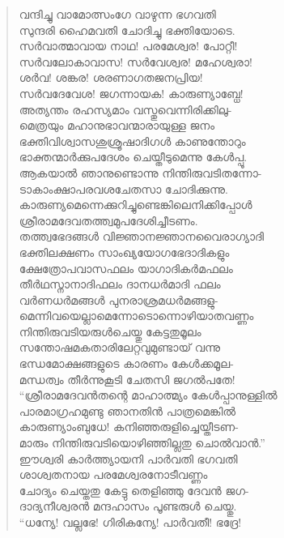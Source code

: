 \begin{verse}
വന്ദിച്ചു വാമോത്സംഗേ വാഴുന്ന ഭഗവതി\\
സുന്ദരി ഹൈമവതി ചോദിച്ചു ഭക്തിയോടെ.\\
സര്‍വാത്മാവായ നാഥ! പരമേശ്വര! പോറ്റീ!\\
സര്‍വലോകാവാസ! സര്‍വേശ്വര! മഹേശ്വരാ!\\
ശര്‍വ! ശങ്കര! ശരണാഗതജനപ്രിയ!\\
സര്‍വദേവേശ! ജഗന്നായക! കാരുണ്യാബ്ധേ!\\
അത്യന്തം രഹസ്യമാം വസ്തുവെന്നിരിക്കിലു-\\
മെത്രയും മഹാനുഭാവന്മാരായുള്ള ജനം\\
ഭക്തിവിശ്വാസശുശ്രൂഷാദിഗള്‍ കാണുന്തോറും\\
ഭാക്തന്മാര്‍ക്കുപദേശം ചെയ്തീടുമെന്നു കേള്‍പ്പൂ.\\
ആകയാല്‍ ഞാനുണ്ടൊന്നു നിന്തിരുവടിതന്നോ-\\
ടാകാംക്ഷാപരവശചേതസാ ചോദിക്കുന്നു.\\
കാരുണ്യമെന്നെക്കുറിച്ചുണ്ടെങ്കിലെനിക്കിപ്പോള്‍\\
ശ്രീരാമദേവതത്ത്വമുപദേശിച്ചീടണം.\\
തത്ത്വഭേദങ്ങള്‍ വിജ്ഞാനജ്ഞാനവൈരാഗ്യാദി\\
ഭക്തിലക്ഷണം സാംഖ്യയോഗഭേദാദികളും\\
ക്ഷേത്രോപവാസഫലം യാഗാദികര്‍മഫലം\\
തീര്‍ഥസ്നാനാദിഫലം ദാനധര്‍മാദി ഫലം\\
വര്‍ണധര്‍മങ്ങള്‍ പുനരാശ്രമധര്‍മങ്ങളു-\\
മെന്നിവയെല്ലാമെന്നോടൊന്നൊഴിയാതവണ്ണം\\
നിന്തിരുവടിയരുള്‍ചെയ്തു കേട്ടതുമൂലം\\
സന്തോഷമകതാരിലേറ്റവുമുണ്ടായ് വന്നു\\
ഭന്ധമോക്ഷങ്ങളുടെ കാരണം കേള്‍ക്കമൂല-\\
മന്ധത്വം തീര്‍ന്നുകൂടി ചേതസി ജഗല്‍പതേ!\\
“ശ്രീരാമദേവന്‍തന്റെ മാഹാത്മ്യം കേള്‍പ്പാനുള്ളില്‍\\
പാരമാഗ്രഹമുണ്ടു ഞാനതിന്‍ പാത്രമെങ്കില്‍\\
കാരുണ്യാംബുധേ! കനിഞ്ഞരുളിച്ചെയ്തീടണ-\\
മാരും നിന്തിരുവടിയൊഴിഞ്ഞില്ലതു ചൊല്‍വാന്‍.”\\
ഈശ്വരി കാര്‍ത്ത്യായനി പാര്‍വതി ഭഗവതി\\
ശാശ്വതനായ പരമേശ്വരനോടീവണ്ണം\\
ചോദ്യം ചെയ്തതു കേട്ടു തെളിഞ്ഞു ദേവന്‍ ജഗ-\\
ദാദ്യനീശ്വരന്‍ മന്ദഹാസം പൂണ്ടരുള്‍ ചെയ്തു.\\
“ധന്യേ! വല്ലഭേ! ഗിരികന്യേ! പാര്‍വതീ! ഭദ്രേ!\\

\end{verse}
